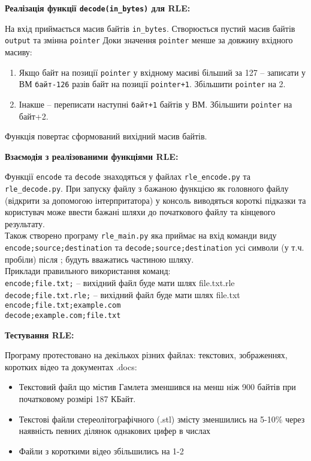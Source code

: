 \documentclass{article}
\def\code#1{\texttt{#1}}
\begin{document}
\textbf{Реалізація функції \code{decode(in\_bytes)} для RLE:}
\\\indent

На вхід приймається масив байтів \code{in\_bytes}. Створюється пустий масив байтів \code{output} та змінна \code{pointer}
Доки значення \code{pointer} менше за довжину вхідного масиву:
\begin{enumerate}
\item Якщо байт на позиції \code{pointer} у вхідному масиві більший за 127 -- записати у ВМ \code{байт-126} разів байт на позиції \code{pointer+1}. Збільшити \code{pointer} на 2.
\item Інакше -- переписати наступні \code{байт+1} байтів у ВМ. Збільшити \code{pointer} на байт+2.
\end{enumerate}
Функція повертає сформований вихідний масив байтів.\\\indent

\textbf{Взаємодія з реалізованими функціями RLE:}\\\indent

Функції \code{encode} та \code{decode} знаходяться у файлах \code{rle\_encode.py} та\\ \code{rle\_decode.py}. При запуску файлу з бажаною функцією як головного файлу (відкрити за допомогою інтерпритатора) у консоль виводяться короткі підказки та користувач може ввести бажані шляхи до початкового файлу та кінцевого результату.\\\indent
Також створено програму \code{rle\_main.py} яка приймає на вхід команди виду \code{encode;source;destination} та \code{decode;source;destination} усі символи (у т.ч. пробіли) після ; будуть вважатись частиною шляху.\\\indent
Приклади правильного використання команд:\\
\code{encode;file.txt;} -- вихідний файл буде мати шлях file.txt.rle\\
\code{decode;file.txt.rle;} -- вихідний файл буде мати шлях file.txt\\
\code{encode;file.txt;example.com}\\
\code{decode;example.com;file.txt}\\\indent

\textbf{Тестування RLE:}\\\indent

Програму протестовано на декількох різних файлах: текстових, зображеннях, коротких відео та документах .docs:
\begin{itemize}
\item Текстовий файл що містив Гамлета зменшився на менш ніж 900 байтів при початковому розмірі 187 КБайт.
\item Текстові файли стереолітографічного (.stl) змісту зменшились на 5-10\% через наявність певних ділянок однакових цифер в числах
\item Файли з короткими відео збільшились на 1-2%
\end{itemize}
\end{document}
